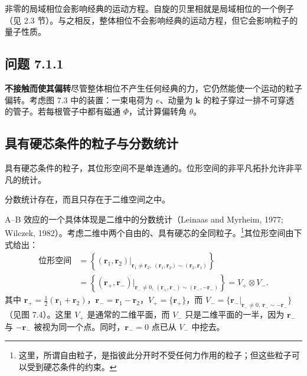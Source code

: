 非零的局域相位会影响经典的运动方程。自旋的贝里相就是局域相位的一个例子（见 2.3 节）。与之相反，整体相位不会影响经典的运动方程，但它会影响粒子的量子性质。

\subsection*{问题 7.1.1}

\textbf{不接触而使其偏转}\quad 尽管整体相位不产生任何经典的力，它仍然能使一个运动的粒子偏转。考虑图 7.3 中的装置：一束电荷为 $e$、动量为 $\pmb{k}$ 的粒子穿过一排不可穿透的管子。若每根管子中都有磁通 $\Phi$，试计算偏转角 $\theta$。


\subsection{具有硬芯条件的粒子与分数统计}

\begin{keypoints}
\item 具有硬芯条件的粒子，其位形空间不是单连通的。位形空间的非平凡拓扑允许非平凡的统计。
\item 分数统计存在，而且只存在于二维空间之中。
\end{keypoints}

A--B 效应的一个具体体现是二维中的分数统计（Leinaas and Myrheim, 1977; Wilczek, 1982）。考虑二维中两个自由的、具有硬芯的全同粒子。\footnote{这里，所谓自由粒子，是指彼此分开时不受任何力作用的粒子；但这些粒子可以受到硬芯条件的约束。}其位形空间由下式给出：
\begin{equation*}
\begin{aligned}
\text{位形空间} &= \left\{(\pmb{r}_1, \pmb{r}_2)\big|_{\pmb{r}_1\neq\pmb{r}_2,\ (\pmb{r}_1,\pmb{r}_2)\sim(\pmb{r}_2,\pmb{r}_1)}\right\}\\
&= \left\{(\pmb{r}_+, \pmb{r}_-)\big|_{\pmb{r}_-\neq 0,\ (\pmb{r}_+,\pmb{r}_-)\sim(\pmb{r}_-,-\pmb{r}_-)}\right\} = V_+\otimes V_-.
\end{aligned}
\end{equation*}
其中 $\pmb{r}_+=\frac{1}{2}(\pmb{r}_1+\pmb{r}_2)$，$\pmb{r}_-=\pmb{r}_1-\pmb{r}_2$，$V_+=\{\pmb{r}_+\}$，而 $V_-=\{\pmb{r}_-|_{\pmb{r}_-\neq 0,\ \pmb{r}_-\sim-\pmb{r}_-}\}$（见图 7.4）。这里 $V_+$ 是通常的二维平面，而 $V_-$ 只是二维平面的一半，因为 $\pmb{r}_-$ 与 $-\pmb{r}_-$ 被视为同一个点。同时，$\pmb{r}_-=0$ 点已从 $V_-$ 中挖去。

